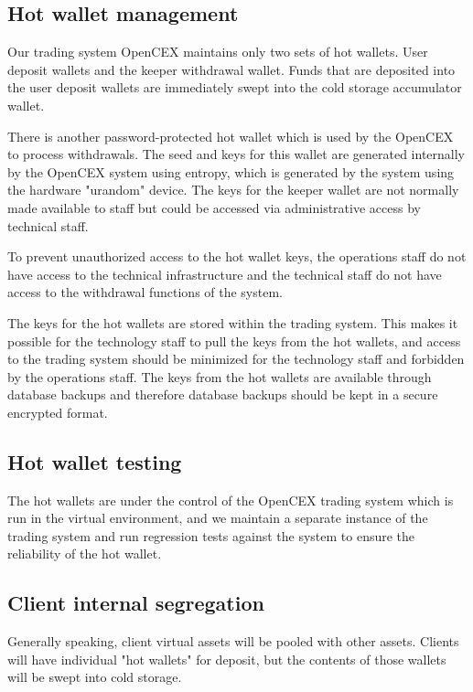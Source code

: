 \subsection{Hot wallet management}
Our trading system OpenCEX maintains only two sets of hot
wallets.  User deposit wallets and the keeper withdrawal wallet.
Funds that are deposited into the user deposit wallets are immediately
swept into the cold storage accumulator wallet.

There is another password-protected hot wallet which is used by the
OpenCEX to process withdrawals.  The seed and keys for this wallet are
generated internally by the OpenCEX system using entropy, which is
generated by the system using the hardware "urandom" device.  The
keys for the keeper wallet are not normally made available to staff
but could be accessed via administrative access by technical staff.

To prevent unauthorized access to the hot wallet keys, the
operations staff do not have access to the technical infrastructure
and the technical staff do not have access to the withdrawal functions
of the system.

The keys for the hot wallets are stored within the trading system.
This makes it possible for the technology staff to pull the keys from
the hot wallets, and access to the trading system should be
minimized for the technology staff and forbidden by the operations
staff.  The keys from the hot wallets are available through database
backups and therefore database backups should be kept in a secure
encrypted format.

\subsection{Hot wallet testing}
The hot wallets are under the control of the OpenCEX trading system
which is run in the virtual environment, and we maintain a separate
instance of the trading system and run regression tests against the
system to ensure the reliability of the hot wallet.


\subsection{Client internal segregation}
Generally speaking, client virtual assets will be pooled with other
assets.  Clients will have individual "hot wallets" for deposit, but
the contents of those wallets will be swept into cold storage.

